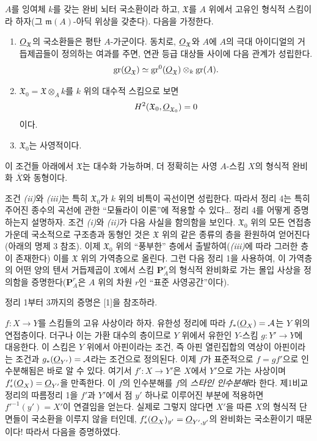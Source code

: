  $A$를 잉여체 $k$를 갖는 완비 뇌터 국소환이라 하고,
$\mathfrak X$를 $A$ 위에서 고유인 형식적 스킴이라 하자(그
$\mathfrak m(A)$-아딕 위상을 갖춘다). 다음을 가정한다.
\begin{enumerate}
  \item[\textit{i.}] $\underline{O}_{\mathfrak X}$의 국소환들은 평탄
    $A$-가군이다. 동치로, $\underline{O}_{\mathfrak X}$와 $A$에 $A$의 극대
    아이디얼의 거듭제곱들이 정의하는 여과를 주면, 연관 등급 대상들 사이에
    다음 관계가 성립한다.
    \[
      \operatorname{gr}(\underline{O}_{\mathfrak X})
      \simeq
      \operatorname{gr}^{0}(\underline{O}_{\mathfrak X})
      \otimes_k\operatorname{gr}(A).
    \]
  \item[\textit{ii.}]
    $\mathfrak X_0=\mathfrak X\otimes_A k$를 $k$ 위의 대수적 스킴으로 보면
    \[
      H^2(\mathfrak X_0,\underline{O}_{\mathfrak X_0})=0
    \]
    이다.
  \item[\textit{iii.}] $\mathfrak X_0$는 사영적이다.
\end{enumerate}
이 조건들 아래에서 $\mathfrak X$는 대수화 가능하며, 더 정확히는 사영
$A$-스킴 $X$의 형식적 완비화 $\overline X$와 동형이다.

조건 \textit{(ii)}와 \textit{(iii)}는 특히 $\mathfrak X_0$가 $k$ 위의
비특이 곡선이면 성립한다. 따라서 정리 4는 특히 주어진 종수의 곡선에 관한
``모듈라이 이론''에 적용할 수 있다\ldots{} 정리 4를 어떻게 증명하는지
설명하자. 조건 \textit{(i)}와 \textit{(ii)}가 다음 사실을 함의함을
보인다. $\mathfrak X_0$ 위의 모든 연접층 가운데 국소적으로 구조층과
동형인 것은 $\mathfrak X$ 위의 같은 종류의 층을 환원하여 얻어진다
(아래의 명제 3 참조).
이제 $\mathfrak X_0$ 위의 ``풍부한'' 층에서 출발하여(\textit{(iii)}에
따라 그러한 층이 존재한다) 이를 $\mathfrak X$ 위의 가역층으로 올린다.
그런 다음 정리 1을 사용하여, 이 가역층의 어떤 양의 텐서 거듭제곱이
$\mathfrak X$에서 스킴 $\mathbf P_A^r$의 형식적 완비화로 가는 몰입
사상을 정의함을 증명한다($\mathbf P_A^r$은 $A$ 위의 차원 $r$인
``표준 사영공간''이다).

정리 1부터 3까지의 증명은 [1]을 참조하라.


$f:X\longrightarrow Y$를 스킴들의 고유 사상이라 하자. 유한성 정리에 따라
$f_*(\underline{O}_X)=\mathcal A$는 $Y$ 위의 연접층이다. 더구나 이는 가환 대수의
층이므로 $Y$ 위에서 유한인 $Y$-스킴 $g:Y'\longrightarrow Y$에 대응한다.
이 스킴은 $Y$ 위에서 아핀이라는 조건, 즉 아핀 열린집합의 역상이 아핀이라는
조건과 $g_*(\underline{O}_{Y'})=\mathcal A$라는 조건으로 정의된다. 이제 $f$가
표준적으로 $f=gf'$으로 인수분해됨은 바로 알 수 있다. 여기서
$f':X\longrightarrow Y'$은 $X$에서 $Y'$으로 가는 사상이며
$f'_*(\underline{O}_X)=\underline{O}_{Y'}$을 만족한다. 이 $f$의 인수분해를 $f$의
\emph{스타인 인수분해}라 한다. 제1비교정리의 따름정리 1을 $f'$과
$Y'$에서 점 $y'$ 하나로 이루어진 부분에 적용하면
$f'^{-1}(y')=X'$이 연결임을 얻는다. 실제로 그렇지 않다면 $X'$을 따른
$X$의 형식적 단면들이 국소환을 이루지 않을 터인데,
$f'_*(\underline{O}_X)_{y'}=\underline{O}_{Y',y'}$의 완비화는 국소환이기 때문이다! 따라서
다음을 증명하였다.

